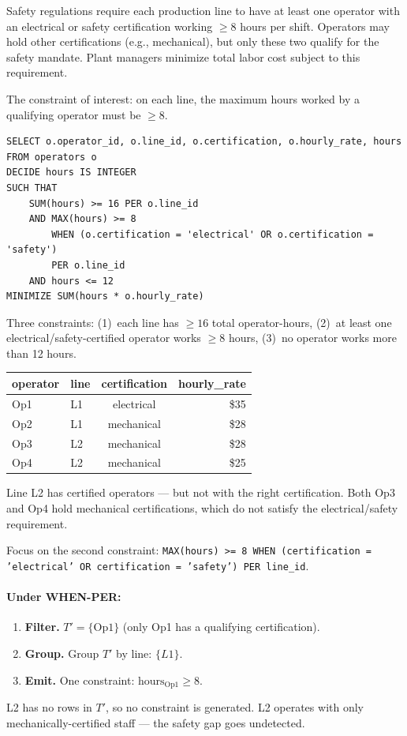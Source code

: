 \documentclass[11pt]{article}
\begin{document}
Safety regulations require each production line to have at least one operator
with an electrical or safety certification working $\geq 8$ hours per shift.
Operators may hold other certifications (e.g., mechanical), but only these
two qualify for the safety mandate. Plant managers minimize total labor cost
subject to this requirement.

The constraint of interest: on each line, the maximum hours worked by a
qualifying operator must be $\geq 8$.

\begin{lstlisting}
SELECT o.operator_id, o.line_id, o.certification, o.hourly_rate, hours
FROM operators o
DECIDE hours IS INTEGER
SUCH THAT
    SUM(hours) >= 16 PER o.line_id
    AND MAX(hours) >= 8
        WHEN (o.certification = 'electrical' OR o.certification = 'safety')
        PER o.line_id
    AND hours <= 12
MINIMIZE SUM(hours * o.hourly_rate)
\end{lstlisting}

Three constraints: (1)~each line has $\geq 16$ total operator-hours,
(2)~at least one electrical/safety-certified operator works $\geq 8$ hours,
(3)~no operator works more than 12 hours.

\begin{center}
\begin{tabular}{llcr}
\toprule
\textbf{operator} & \textbf{line} & \textbf{certification} & \textbf{hourly\_rate} \\
\midrule
Op1 & L1 & electrical  & \$35 \\
Op2 & L1 & mechanical  & \$28 \\
Op3 & L2 & mechanical  & \$28 \\
Op4 & L2 & mechanical  & \$25 \\
\bottomrule
\end{tabular}
\end{center}

Line L2 has certified operators --- but not with the right certification.
Both Op3 and Op4 hold mechanical certifications, which do not satisfy the
electrical/safety requirement.

Focus on the second constraint:
\texttt{MAX(hours) >= 8 WHEN (certification = 'electrical' OR certification = 'safety') PER line\_id}.

\paragraph{Under WHEN-PER:}
\begin{enumerate}[leftmargin=2em]
    \item \textbf{Filter.} $T' = \{\text{Op1}\}$ (only Op1 has a qualifying certification).
    \item \textbf{Group.} Group $T'$ by line: $\{L1\}$.
    \item \textbf{Emit.} One constraint: $\text{hours}_{\text{Op1}} \geq 8$.
\end{enumerate}
L2 has no rows in $T'$, so no constraint is generated. L2 operates with
only mechanically-certified staff --- the safety gap goes undetected.
\end{document}
